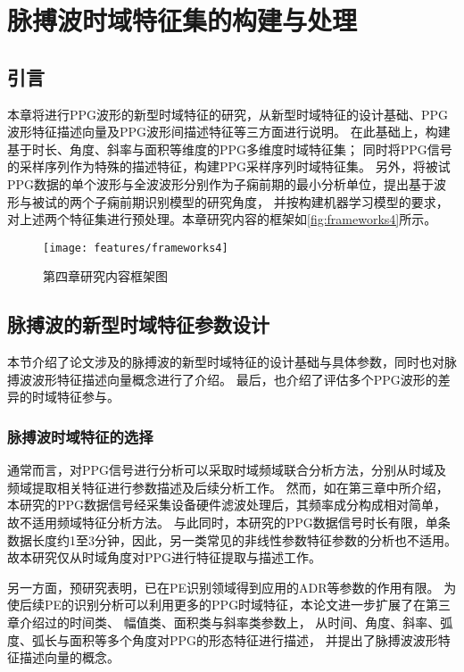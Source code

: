 \chapter{脉搏波时域特征集的构建与处理}
\section{引言}
本章将进行PPG波形的新型时域特征的研究，从新型时域特征的设计基础、PPG波形特征描述向量及PPG波形间描述特征等三方面进行说明。
在此基础上，构建基于时长、角度、斜率与面积等维度的PPG多维度时域特征集；
同时将PPG信号的采样序列作为特殊的描述特征，构建PPG采样序列时域特征集。
另外，将被试PPG数据的单个波形与全波波形分别作为子痫前期的最小分析单位，提出基于波形与被试的两个子痫前期识别模型的研究角度，
并按构建机器学习模型的要求，对上述两个特征集进行预处理。本章研究内容的框架如\autoref{fig:frameworks4}所示。
\begin{figure}[htbp]
    \centering
    \texttt{[image: features/frameworks4]}
    \caption{\label{fig:frameworks4}第四章研究内容框架图}
\end{figure}

\section{脉搏波的新型时域特征参数设计}
本节介绍了论文涉及的脉搏波的新型时域特征的设计基础与具体参数，同时也对脉搏波波形特征描述向量概念进行了介绍。
最后，也介绍了评估多个PPG波形的差异的时域特征参与。

\subsection{脉搏波时域特征的选择}
通常而言，对PPG信号进行分析可以采取时域频域联合分析方法，分别从时域及频域提取相关特征进行参数描述及后续分析工作。
然而，如在第三章中所介绍，本研究的PPG数据信号经采集设备硬件滤波处理后，其频率成分构成相对简单，故不适用频域特征分析方法。
与此同时，本研究的PPG数据信号时长有限，单条数据长度约1至3分钟，因此，另一类常见的非线性参数特征参数的分析也不适用。
故本研究仅从时域角度对PPG进行特征提取与描述工作。

另一方面，预研究表明，已在PE识别领域得到应用的ADR等参数的作用有限\cite{Feng2018,ChenH2019}。
为使后续PE的识别分析可以利用更多的PPG时域特征，本论文进一步扩展了在第三章介绍过的时间类\cite{Chen2019,mmt,Brumfield2005,Su2014}、
幅值类\cite{Su2014,Elgendi2012,Luo1988,PPGYY}、面积类\cite{Feng2018}与斜率类\cite{Chen2019}参数上，
从时间、角度、斜率、弧度、弧长与面积等多个角度对PPG的形态特征进行描述\cite{ChenH2019,Feng2023,FengJiang2018}，
并提出了脉搏波波形特征描述向量的概念\cite{ChenH2019,Feng2023,FengJiang2018}。

